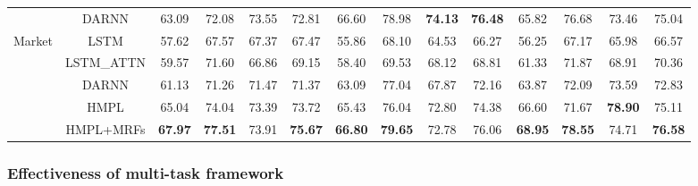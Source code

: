 \documentclass[sigconf, anonymous, review]{acmart}
\begin{document}
\begin{table}[t]
\begin{tabular}{@{}cccccccccccccc@{}}
                           & DARNN                           & 63.09 & 72.08          & 73.55          & 72.81                      & 66.60          & 78.98          & \textbf{74.13}          & \textbf{76.48}                               & 65.82          & 76.68          & 73.46          & 75.04          \\ \cmidrule(r){1-2} \cmidrule(lr){4-5} \cmidrule(lr){8-9} \cmidrule(lr){12-13}
\multirow{5}{*}{Market}    & LSTM                            & 57.62                      & 67.57          & 67.37          & 67.47                      & 55.86          & 68.10          & 64.53          & 66.27                               & 56.25          & 67.17          & 65.98          & 66.57          \\
                           & \multicolumn{1}{c|}{LSTM\_ATTN} & 59.57                      & 71.60          & 66.86          & \multicolumn{1}{c|}{69.15} & 58.40          & 69.53          & 68.12          & \multicolumn{1}{c|}{68.81}          & 61.33          & 71.87          & 68.91          & 70.36          \\
                           & \multicolumn{1}{c|}{DARNN}      & 61.13                      & 71.26          & 71.47          & \multicolumn{1}{c|}{71.37} & 63.09          & 77.04          & 67.87          & \multicolumn{1}{c|}{72.16}          & 63.87          & 72.09          & 73.59          & 72.83          \\
                           & \multicolumn{1}{c|}{HMPL}       & 65.04                      & 74.04          & 73.39          & \multicolumn{1}{c|}{73.72} & 65.43          & 76.04          & 72.80 & \multicolumn{1}{c|}{74.38} & 66.60          & 71.67          & \textbf{78.90} & 75.11          \\
                           & HMPL+MRFs                       & \textbf{67.97}             & \textbf{77.51} & 73.91          & \textbf{75.67}             & \textbf{66.80} & \textbf{79.65} & 72.78          & 76.06                               & \textbf{68.95} & \textbf{78.55} & 74.71          & \textbf{76.58} \\ \bottomrule
\end{tabular}
\label{tab:result}
\end{table}

\subsubsection{Effectiveness of multi-task framework}
\end{document}
